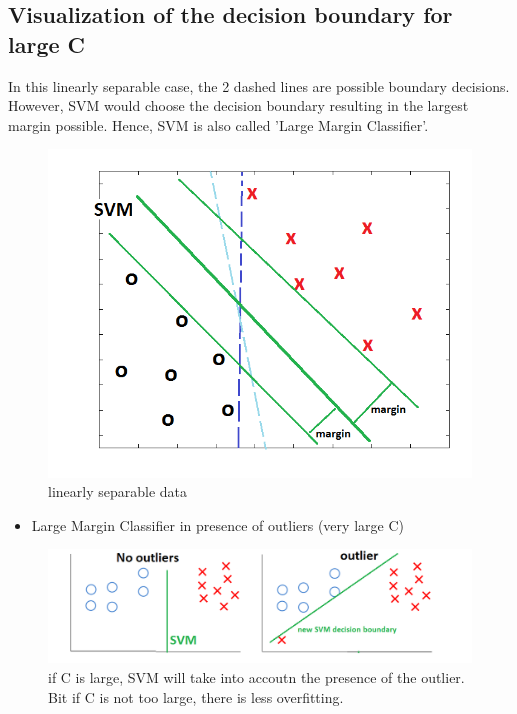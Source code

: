 \documentclass[a4paper,12pt]{report}
\begin{document}
\subsection{Visualization of the decision boundary for large C}
In this linearly separable case, the 2 dashed lines are possible boundary decisions. However, SVM would choose the decision boundary resulting in the largest margin possible. Hence, SVM is also called 'Large Margin Classifier'.
\begin{figure}[H]
	\centering
        \includegraphics[totalheight=4 cm]{SVM_margin.png}\caption{linearly separable data}
\end{figure}
\begin{itemize}
\item Large Margin Classifier in presence of outliers (very large C)
\end{itemize}

\begin{figure}[H]
	\centering
        \includegraphics[totalheight=4 cm]{outlier.png}\caption{if C is large, SVM will take into accoutn the presence of the outlier. Bit if C is not too large, there is less overfitting. }
\end{figure}
\end{document}

